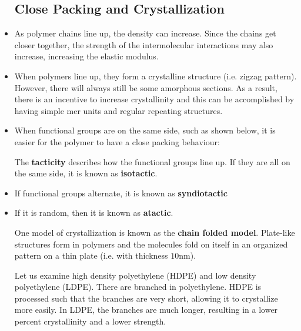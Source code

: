 \begin{itemize}
    \subsection{Close Packing and Crystallization}
    \item As polymer chains line up, the density can increase. Since the chains get closer together, the strength of the intermolecular interactions may also increase, increasing the elastic modulus.
    \item When polymers line up, they form a crystalline structure (i.e. zigzag pattern). However, there will always still be some amorphous sections. As a result, there is an incentive to increase crystallinity and this can be accomplished by having simple mer units and regular repeating structures.
    \item When functional groups are on the same side, such as shown below, it is easier for the polymer to have a close packing behaviour:
    \begin{center}
    \end{center}
    The \textbf{tacticity} describes how the functional groups line up. If they are all on the same side, it is known as \textbf{isotactic}.
    \item If functional groups alternate, it is known as \textbf{syndiotactic}
    \begin{center}
    \end{center}
    \item If it is random, then it is known as \textbf{atactic}.
    \begin{idea}
        One model of crystallization is known as the \textbf{chain folded model}. Plate-like structures form in polymers and the molecules fold on itself in an organized pattern on a thin plate (i.e. with thickness $10\si{\nano\meter}$).
    \end{idea}
    \begin{case}
        Let us examine high density polyethylene (HDPE) and low density polyethylene (LDPE). There are branched in polyethylene. HDPE is processed such that the branches are very short, allowing it to crystallize more easily. In LDPE, the branches are much longer, resulting in a lower percent crystallinity and a lower strength.
    \end{case}

\end{itemize}
